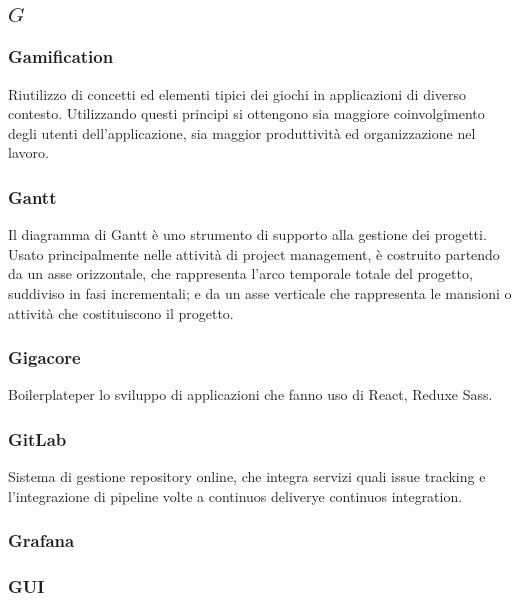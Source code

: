 \subsection*{\quad$G\quad$}
\subsubsection*{Gamification}
Riutilizzo di concetti ed elementi tipici dei giochi in applicazioni di diverso contesto. Utilizzando questi principi si ottengono sia maggiore coinvolgimento degli utenti dell'applicazione, sia maggior produttività ed organizzazione nel lavoro.

\subsubsection*{Gantt}
Il diagramma di Gantt è uno strumento di supporto alla gestione dei progetti. Usato principalmente nelle attività di project management, è costruito partendo da un asse orizzontale, che rappresenta l'arco temporale totale del progetto, suddiviso in fasi incrementali; e da un asse
verticale che rappresenta le mansioni o attività che costituiscono il progetto.

\subsubsection*{Gigacore}
Boilerplate\glosp per lo sviluppo di applicazioni che fanno uso di React\glo, Redux\glosp e Sass\glo.

\subsubsection*{GitLab}
Sistema di gestione repository online, che integra servizi quali issue tracking e l’integrazione di pipeline volte a continuos delivery\glosp e continuos integration\glo.

\subsubsection*{Grafana}

\subsubsection*{GUI}

